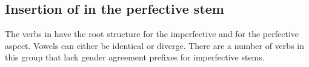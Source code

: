
\subsection{Insertion of  in the perfective stem}
\label{ssec:Insertion of r in the perfective stem}

The verbs in  have the root structure  for the imperfective and  for the perfective aspect. Vowels can either be identical or diverge. There are a number of verbs in this group that lack gender agreement prefixes for imperfective stems.
%
